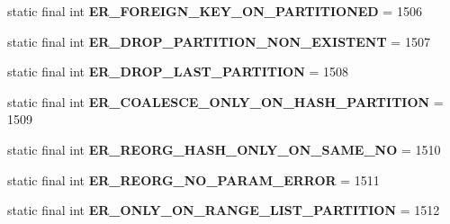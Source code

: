 \begin{DoxyCompactItemize}
static final int {\bfseries E\+R\+\_\+\+F\+O\+R\+E\+I\+G\+N\+\_\+\+K\+E\+Y\+\_\+\+O\+N\+\_\+\+P\+A\+R\+T\+I\+T\+I\+O\+N\+ED} = 1506
\item 
\mbox{\label{classcom_1_1mysql_1_1jdbc_1_1_mysql_error_numbers_a1e30132597636fd82231dfd90165aee6}} 
static final int {\bfseries E\+R\+\_\+\+D\+R\+O\+P\+\_\+\+P\+A\+R\+T\+I\+T\+I\+O\+N\+\_\+\+N\+O\+N\+\_\+\+E\+X\+I\+S\+T\+E\+NT} = 1507
\item 
\mbox{\label{classcom_1_1mysql_1_1jdbc_1_1_mysql_error_numbers_a6dfc38bdc890a9cba233420a99802e3b}} 
static final int {\bfseries E\+R\+\_\+\+D\+R\+O\+P\+\_\+\+L\+A\+S\+T\+\_\+\+P\+A\+R\+T\+I\+T\+I\+ON} = 1508
\item 
\mbox{\label{classcom_1_1mysql_1_1jdbc_1_1_mysql_error_numbers_af77d46e2805319f8390e37b2d7c653b7}} 
static final int {\bfseries E\+R\+\_\+\+C\+O\+A\+L\+E\+S\+C\+E\+\_\+\+O\+N\+L\+Y\+\_\+\+O\+N\+\_\+\+H\+A\+S\+H\+\_\+\+P\+A\+R\+T\+I\+T\+I\+ON} = 1509
\item 
\mbox{\label{classcom_1_1mysql_1_1jdbc_1_1_mysql_error_numbers_a81ecb10d5f3d7247378c73507bbc3e20}} 
static final int {\bfseries E\+R\+\_\+\+R\+E\+O\+R\+G\+\_\+\+H\+A\+S\+H\+\_\+\+O\+N\+L\+Y\+\_\+\+O\+N\+\_\+\+S\+A\+M\+E\+\_\+\+NO} = 1510
\item 
\mbox{\label{classcom_1_1mysql_1_1jdbc_1_1_mysql_error_numbers_a19f9f4a6aa4cd73af17d453ea15b2352}} 
static final int {\bfseries E\+R\+\_\+\+R\+E\+O\+R\+G\+\_\+\+N\+O\+\_\+\+P\+A\+R\+A\+M\+\_\+\+E\+R\+R\+OR} = 1511
\item 
\mbox{\label{classcom_1_1mysql_1_1jdbc_1_1_mysql_error_numbers_adb8d046eb101a4068dd87c0e8f05acef}} 
static final int {\bfseries E\+R\+\_\+\+O\+N\+L\+Y\+\_\+\+O\+N\+\_\+\+R\+A\+N\+G\+E\+\_\+\+L\+I\+S\+T\+\_\+\+P\+A\+R\+T\+I\+T\+I\+ON} = 1512
\item 
\mbox{\label{classcom_1_1mysql_1_1jdbc_1_1_mysql_error_numbers_af4d20bc777e633a11e7845dd4b442ab7}} 

\end{DoxyCompactItemize}
